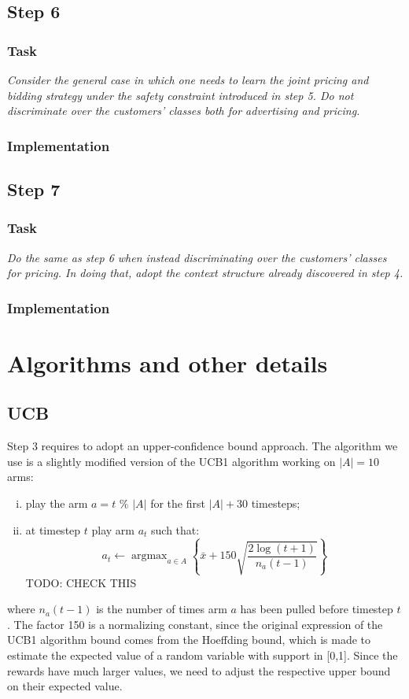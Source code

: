 \documentclass[12pt,a4paper]{report}
\DeclareMathOperator*{\argmax}{argmax}
\begin{document}
		\section{Step 6}
			\subsection{Task}
\textit{Consider the general case in which one needs to learn the joint pricing and bidding strategy under the safety constraint introduced in step 5. Do not discriminate over the customers’ classes both for advertising and pricing.}
			\subsection{Implementation}
		\section{Step 7}
			\subsection{Task}
\textit{Do the same as step 6 when instead discriminating over the customers’ classes for pricing. In doing that, adopt the context structure already discovered in step 4.}
			\subsection{Implementation}

	\chapter{Algorithms and other details}
		\section{UCB}
Step 3 requires to adopt an upper-confidence bound approach. The algorithm we use is a slightly modified version of the UCB1 algorithm working on $|A|=10$ arms:
\begin{enumerate}[i)]
	\item play the arm $a=t$  $\%$  $|A|$ for the first $|A|+30$ timesteps;
	\item at timestep $t$ play arm $a_t$ such that:
		$$a_t \leftarrow \argmax_{a \in A} \left\{\bar x + 150 \sqrt{\frac{2 \log(t+1)}{n_a(t-1)}}\right\} $$
TODO: CHECK THIS
\end{enumerate}
where $n_a(t-1)$ is the number of times arm $a$ has been pulled before timestep $t$. The factor 150 is a normalizing constant, since the original expression of the UCB1 algorithm bound comes from the Hoeffding bound, which is made to estimate the expected value of a random variable with support in [0,1]. Since the rewards have much larger values, we need to adjust the respective upper bound on their expected value.
\end{document}

